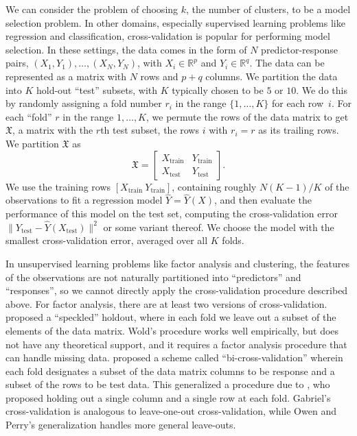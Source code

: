 \documentclass[12pt]{article}
\newcommand{\R}{\mathbb{R}}
\newcommand{\dataX}{\mathfrak{X}}
\newcommand{\Xtrain}{X_{\text{train}}}
\newcommand{\Ytrain}{Y_{\text{train}}}
\newcommand{\Xtest}{X_{\text{test}}}
\newcommand{\Ytest}{Y_{\text{test}}}
\begin{document}
We can consider the problem of choosing $k$, the number of clusters, to be a
model selection problem. In other domains, especially supervised learning
problems like regression and classification, cross-validation is popular for
performing model selection.
In these settings, the data comes in the form of $N$
predictor-response pairs, $(X_1, Y_1), \dotsc, (X_N, Y_N)$, with $X_i \in
\R^{p}$ and $Y_i \in \R^{q}$.  The data can be represented as a matrix with
$N$ rows and $p + q$ columns.  We partition the data into $K$ hold-out
``test'' subsets, with $K$ typically chosen to be $5$ or $10$.  We do this
by randomly assigning a fold number $r_i$ in the range $\{1, \dotsc, K\}$
for each row~$i$. For each ``fold'' $r$ in the range $1, \dotsc, K$, we
permute the rows of the data matrix to get $\dataX$, a matrix with the
$r$th test subset, the rows $i$ with $r_i = r$ as its trailing rows.  
We partition $\dataX$ as
\[
  \dataX =
  \begin{bmatrix}
    \Xtrain & \Ytrain \\
    \Xtest  & \Ytest
  \end{bmatrix}.
\]
We use the training rows $[ \Xtrain\ \Ytrain ]$, containing roughly $N
(K-1)/K$ of the observations to fit a regression model
$\hat Y = \hat Y(X)$, and then evaluate the performance of this model on the
test set, computing the cross-validation error $\|\Ytest - \hat Y(\Xtest)\|^2$
or some variant thereof.  We choose the model with the smallest
cross-validation error, averaged over all $K$ folds.

In unsupervised learning problems like factor analysis and clustering, the
features of the observations are not naturally partitioned into ``predictors''
and ``responses'', so we cannot directly apply the cross-validation procedure
described above.  For factor analysis, there are at least two versions of
cross-validation.  \citet{wold78cross} proposed a ``speckled'' holdout, where
in each fold we leave out a subset of the elements of the data matrix.  Wold's
procedure works well empirically, but does not have any theoretical support,
and it requires a factor analysis procedure that can handle missing data.
\citet{owen2009bi} proposed a scheme called ``bi-cross-validation'' wherein
each fold designates a subset of the data matrix columns to be response and a
subset of the rows to be test data.  This generalized a procedure due to
\citet{gabriel2002biblot}, who proposed holding out a single column and a
single row at each fold. Gabriel's cross-validation is analogous to
leave-one-out cross-validation, while Owen and Perry's generalization handles
more general leave-outs.
\end{document}

